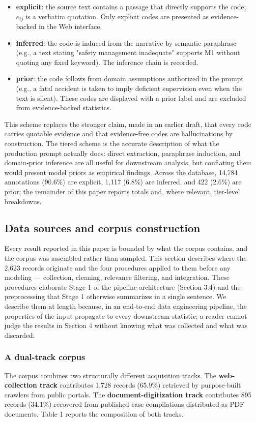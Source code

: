 \documentclass[11pt]{article}
\begin{document}
\begin{itemize}
\item \textbf{explicit}: the source text contains a passage that directly supports the code; $e_{ij}$ is a verbatim quotation. Only explicit codes are presented as evidence-backed in the Web interface.
\item \textbf{inferred}: the code is induced from the narrative by semantic paraphrase (e.g., a text stating "safety management inadequate" supports M1 without quoting any fixed keyword). The inference chain is recorded.
\item \textbf{prior}: the code follows from domain assumptions authorized in the prompt (e.g., a fatal accident is taken to imply deficient supervision even when the text is silent). These codes are displayed with a prior label and are excluded from evidence-backed statistics.
\end{itemize}
This scheme replaces the stronger claim, made in an earlier draft, that every code carries quotable evidence and that evidence-free codes are hallucinations by construction. The tiered scheme is the accurate description of what the production prompt actually does: direct extraction, paraphrase induction, and domain-prior inference are all useful for downstream analysis, but conflating them would present model priors as empirical findings. Across the database, 14,784 annotations (90.6\%) are explicit, 1,117 (6.8\%) are inferred, and 422 (2.6\%) are prior; the remainder of this paper reports totals and, where relevant, tier-level breakdowns.

\subsection{Data sources and corpus construction}
Every result reported in this paper is bounded by what the corpus contains, and the corpus was assembled rather than sampled. This section describes where the 2,623 records originate and the four procedures applied to them before any modeling --- collection, cleaning, relevance filtering, and integration. These procedures elaborate Stage 1 of the pipeline architecture (Section 3.4) and the preprocessing that Stage 1 otherwise summarizes in a single sentence. We describe them at length because, in an end-to-end data engineering pipeline, the properties of the input propagate to every downstream statistic; a reader cannot judge the results in Section 4 without knowing what was collected and what was discarded.

\subsubsection{A dual-track corpus}
The corpus combines two structurally different acquisition tracks. The \textbf{web-collection track} contributes 1,728 records (65.9\%) retrieved by purpose-built crawlers from public portals. The \textbf{document-digitization track} contributes 895 records (34.1\%) recovered from published case compilations distributed as PDF documents. Table 1 reports the composition of both tracks.
\end{document}
